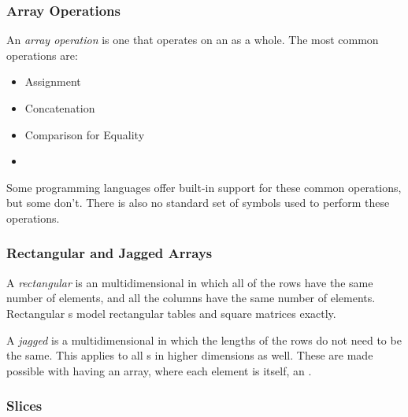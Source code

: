 \subsubsection{Array Operations}\label{subsubsec:Arrays-Operations}
\begin{definition}\label{def:Array_Operation}
  An \emph{array operation} is one that operates on an  as a whole.
  The most common operations are:
  \begin{itemize}[noitemsep]
  \item Assignment
  \item Concatenation
  \item Comparison for Equality
  \item {}
  \end{itemize}
\end{definition}

Some programming languages offer built-in support for these common operations, but some don't.
There is also no standard set of symbols used to perform these operations.

\subsubsection{Rectangular and Jagged Arrays}\label{subsubsec:Arrays-Rectangular_Jagged}
\begin{definition}\label{def:Array-Rectangular}
  A \emph{rectangular } is an multidimensional  in which all of the rows have the same number of elements, and all the columns have the same number of elements.
  Rectangular s model rectangular tables and square matrices exactly.
\end{definition}

\begin{definition}\label{def:Array-Jagged}
  A \emph{jagged } is a multidimensional  in which the lengths of the rows do not need to be the same.
  This applies to all s in higher dimensions as well.
  These are made possible with having an array, where each element is itself, an .
\end{definition}

\subsubsection{Slices}\label{subsubsec:Arrays-Slices}
